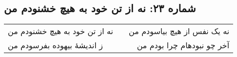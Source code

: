 \begin{center}
\section*{شماره ۲۳: نه از تن خود به هیچ خشنودم من}
\label{sec:023}
\begin{longtable}{l p{0.5cm} r}
نه از تن خود به هیچ خشنودم من
&&
نه یک نفس از هیچ بیاسودم من
\\
ز اندیشهٔ بیهوده بفرسودم من
&&
آخر چو نبودهام چرا بودم من
\\
\end{longtable}
\end{center}
